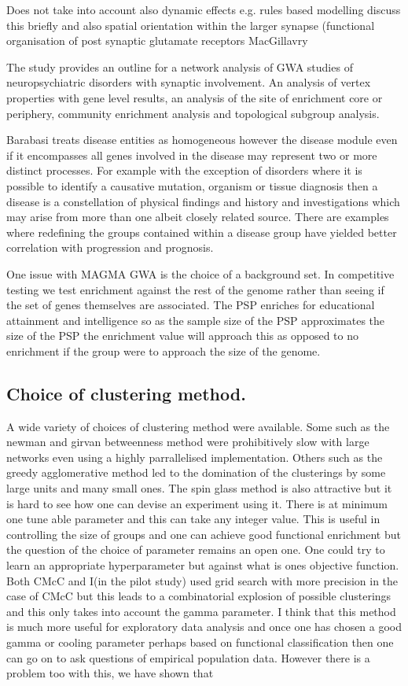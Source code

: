 Does not take into account also dynamic effects e.g. rules based modelling discuss this briefly and also spatial orientation within the larger synapse (functional organisation of post synaptic glutamate receptors MacGillavry

The study provides an outline for a network analysis of GWA studies of neuropsychiatric disorders with synaptic involvement. An analysis of vertex properties with gene level results, an analysis of the site of enrichment core or periphery, community enrichment analysis and topological subgroup analysis. 

Barabasi treats disease entities as homogeneous however the disease module even if it encompasses all genes involved in the disease may represent two or more distinct processes. For example with the exception of disorders where it is possible to identify a causative mutation, organism or tissue diagnosis then a disease is a constellation of physical findings and history and investigations which may arise from more than one albeit closely related source. There are examples where redefining the groups contained within a disease group have yielded better correlation with progression and prognosis. 

One issue with MAGMA GWA is the choice of a background set. In competitive testing we test enrichment against the rest of the genome rather than seeing if the set of genes themselves are associated. The PSP enriches for educational attainment and intelligence so as the sample size of the PSP approximates the size of the PSP the enrichment value will approach this as opposed to no enrichment if the group were to approach the size of the genome. 


\subsection{Choice of clustering method.} 

A wide variety of choices of clustering method were available. Some such as the newman and girvan betweenness method were prohibitively slow with large networks even using a highly parrallelised implementation. Others such as the greedy agglomerative method led to the domination of the clusterings by some large units and many small ones. The spin glass method is also attractive but it is hard to see how one can devise an experiment using it. There is at minimum one tune able parameter and this can take any integer value. This is useful in controlling the size of groups and one can achieve good functional enrichment but the question of the choice of parameter remains an open one. One could try to learn an appropriate hyperparameter but against what is ones objective function. Both CMcC and I(in the pilot study) used grid search with more precision in the case of CMcC but this leads to a combinatorial explosion of possible clusterings and this only takes into account the gamma parameter. I think that this method is much more useful for exploratory data analysis and once one has chosen a good gamma or cooling parameter perhaps based on functional classification then one can go on to ask questions of empirical population data. However there is a problem too with this, we have shown that


